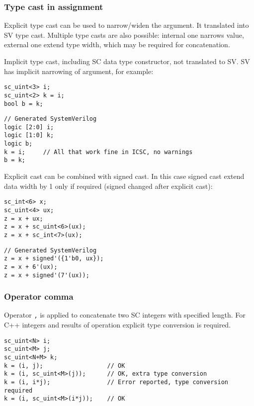 \subsubsection{Type cast in assignment}

Explicit type cast can be used to narrow/widen the argument. It translated into SV type cast. Multiple type casts are also possible: internal one narrows value, external one extend type width, which may be required for concatenation. 

Implicit type cast, including SC data type constructor, not translated to SV. SV has implicit narrowing of argument, for example:
%
\begin{lstlisting}[style=mycpp]
sc_uint<3> i;
sc_uint<2> k = i;
bool b = k;
\end{lstlisting}
%
\begin{lstlisting}[style=myverilog]
// Generated SystemVerilog
logic [2:0] i;
logic [1:0] k;
logic b;
k = i;     // All that work fine in ICSC, no warnings
b = k;     
\end{lstlisting}

Explicit cast can be combined with signed cast. In this case signed cast extend data width by 1 only if required (signed changed after explicit cast):
%
\begin{lstlisting}[style=mycpp]
sc_int<6> x;
sc_uint<4> ux;
z = x + ux;
z = x + sc_uint<6>(ux);
z = x + sc_int<7>(ux);
\end{lstlisting}
%
\begin{lstlisting}[style=myverilog]
// Generated SystemVerilog
z = x + signed'({1'b0, ux});
z = x + 6'(ux);
z = x + signed'(7'(ux));
\end{lstlisting}

\subsubsection{Operator comma}

Operator {\tt ,} is applied to concatenate two SC integers with specified length. For C++ integers and results of operation explicit type conversion is required.
%
\begin{lstlisting}[style=mycpp]
sc_uint<N> i; 
sc_uint<M> j; 
sc_uint<N+M> k;
k = (i, j);                  // OK 
k = (i, sc_uint<M>(j));      // OK, extra type conversion
k = (i, i*j);                // Error reported, type conversion required
k = (i, sc_uint<M>(i*j));    // OK
\end{lstlisting}




